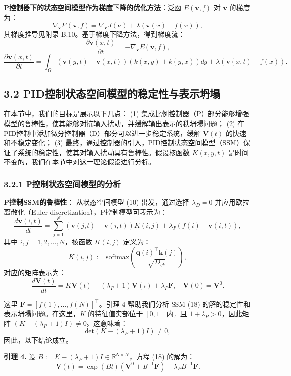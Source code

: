 \documentclass[lang=cn,a4paper,newtx]{elegantpaper}
\begin{document}
\textbf{P控制器下的状态空间模型作为梯度下降的优化方法}：泛函 $E(\mathbf{v}, f)$ 对 $\mathbf{v}$ 的梯度为：
\[
\nabla_{\mathbf{v}} E(\mathbf{v}, f) = \nabla_{\mathbf{v}} J(\mathbf{v}) + \lambda (\mathbf{v}(x) - f(x)),
\]
其梯度推导见附录 B.10。基于梯度下降方法，得到梯度流：
\[
\frac{\partial \mathbf{v}(x, t)}{\partial t} = -\nabla_{\mathbf{v}} E(\mathbf{v}, f),
\]
\[
\frac{\partial \mathbf{v}(x, t)}{\partial t} =
\int_\Omega (\mathbf{v}(y, t) - \mathbf{v}(x, t)) (k(x, y) + k(y, x)) dy
+ \lambda (\mathbf{v}(x, t) - f(x)). \tag{12}
\]

\subsection*{3.2 PID控制状态空间模型的稳定性与表示坍塌}

在本节中，我们的目标是展示以下几点：
(1) 集成比例控制器（P）部分能够增强模型的鲁棒性，使其能够对抗输入扰动，并缓解输出表示的秩坍塌问题；
(2) 在PID控制中添加微分控制器（D）部分可以进一步稳定系统，缓解 $\mathbf{V}(t)$ 的快速和不稳定变化；
(3) 最终，通过控制器的引入，PID控制状态空间模型（SSM）保证了系统的稳定性，使其对输入扰动具有鲁棒性。假设核函数 $K(x, y, t)$ 是时间不变的，我们在本节中对这一理论假设进行分析。

\subsubsection*{3.2.1 P控制状态空间模型的分析}

\textbf{P控制SSM的鲁棒性}：  
从状态空间模型 (10) 出发，通过选择 $\lambda_D = 0$ 并应用欧拉离散化（Euler discretization），P控制模型可表示为：
\[
\frac{d\mathbf{v}(i, t)}{dt} = \sum_{j=1}^N (\mathbf{v}(j, t) - \mathbf{v}(i, t)) K(i, j) 
+ \lambda_P (f(i) - \mathbf{v}(i, t)),
\]
其中 $i, j = 1, 2, \dots, N$，核函数 $K(i, j)$ 定义为：
\[
K(i, j) := \text{softmax}\left(\frac{\mathbf{q}(i)^\top \mathbf{k}(j)}{\sqrt{D_{qk}}}\right),
\]
对应的矩阵表示为：
\[
\frac{d\mathbf{V}(t)}{dt} = K\mathbf{V}(t) - (\lambda_P + 1)\mathbf{V}(t) + \lambda_P \mathbf{F}, \quad \mathbf{V}(0) = \mathbf{V}^0. \tag{18}
\]

这里 $\mathbf{F} = [f(1), \dots, f(N)]^\top$。引理 4 帮助我们分析 SSM (18) 的解的稳定性和表示坍塌问题。在这里，$K$ 的特征值实部位于 $[0, 1]$ 内，且 $1 + \lambda_P > 0$，因此矩阵 $(K - (\lambda_P + 1)I) \neq 0$。这意味着：
\[
\text{det}(K - (\lambda_P + 1)I) \neq 0,
\]
因此，以下结论成立。

\textbf{引理 4.}  
设 $B := K - (\lambda_P + 1)I \in \mathbb{R}^{N \times N}$，方程 (18) 的解为：
\[
\mathbf{V}(t) = \exp(Bt)\left(\mathbf{V}^0 + B^{-1}\mathbf{F}\right) - \lambda_P B^{-1}\mathbf{F}. \tag{19}
\]
\end{document}
